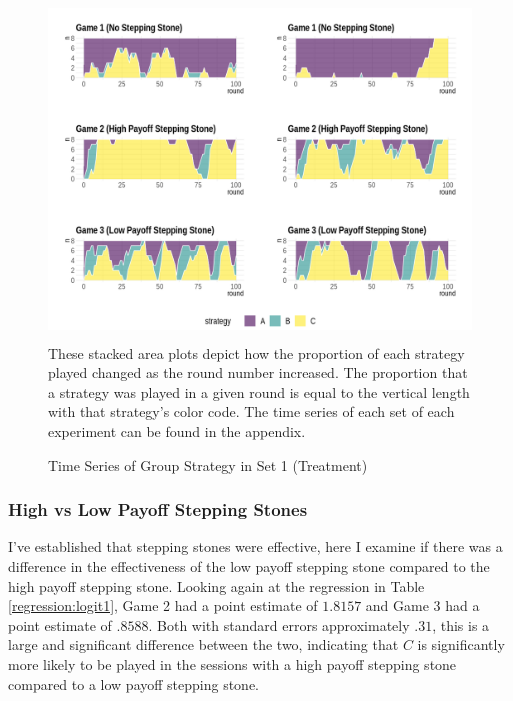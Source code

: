 \begin{figure}[H]
  \captionsetup{justification=centering}
  \caption[caption]{Time Series of Group Strategy in Set 1 (Treatment)}
  \label{fig:Set1}
  \includegraphics[width=\textwidth, height=340px]{Images/AllAreaPlotSet1_2.png}
  These stacked area plots depict how the proportion of each strategy played changed as the round number increased. The proportion that a strategy was played in a given round is equal to the vertical length with that strategy's color code. The time series of each set of each experiment can be found in the appendix. 
\end{figure}

\subsubsection*{High vs Low Payoff Stepping Stones}

I've established that stepping stones were effective, here I examine if there was a difference in the effectiveness of the low payoff stepping stone compared to the high payoff stepping stone. Looking again at the regression in Table \ref{regression:logit1}, Game 2 had a point estimate of $1.8157$ and Game 3 had a point estimate of $.8588$. Both with standard errors approximately $.31$, this is a large and significant difference between the two, indicating that $C$ is significantly more likely to be played in the sessions with a high payoff stepping stone compared to a low payoff stepping stone. 

